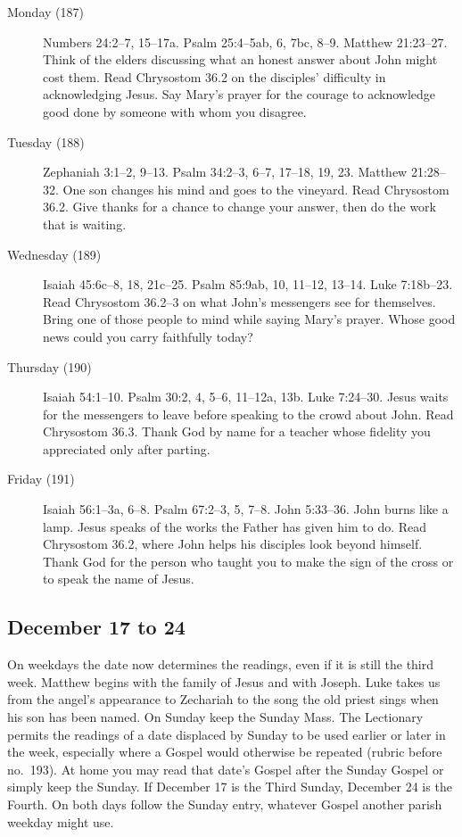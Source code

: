 \begin{description}
\item[Monday (187)] Numbers 24:2--7, 15--17a. Psalm 25:4--5ab, 6, 7bc,
8--9. Matthew 21:23--27. Think of the elders discussing what an honest
answer about John might cost them. Read Chrysostom 36.2 on the disciples'
difficulty in acknowledging Jesus. Say Mary's prayer for the courage to
acknowledge good done by someone with whom you disagree.
\item[Tuesday (188)] Zephaniah 3:1--2, 9--13. Psalm 34:2--3, 6--7,
17--18, 19, 23. Matthew 21:28--32. One son changes his mind and goes
to the vineyard. Read Chrysostom 36.2. Give thanks for a chance to change
your answer, then do the work that is waiting.
\item[Wednesday (189)] Isaiah 45:6c--8, 18, 21c--25. Psalm 85:9ab, 10,
11--12, 13--14. Luke 7:18b--23. Read Chrysostom 36.2--3 on what John's
messengers see for themselves. Bring one of those people to mind while
saying Mary's prayer. Whose good news could you carry faithfully today?
\item[Thursday (190)] Isaiah 54:1--10. Psalm 30:2, 4, 5--6, 11--12a,
13b. Luke 7:24--30. Jesus waits for the messengers to leave before
speaking to the crowd about John. Read Chrysostom 36.3. Thank God by
name for a teacher whose fidelity you appreciated only after parting.
\item[Friday (191)] Isaiah 56:1--3a, 6--8. Psalm 67:2--3, 5, 7--8.
John 5:33--36. John burns like a lamp. Jesus speaks of the works the
Father has given him to do. Read Chrysostom 36.2, where John helps his
disciples look beyond himself. Thank God for the person who taught you
to make the sign of the cross or to speak the name of Jesus.
\end{description}

\subsection{December 17 to 24}
\label{sec:pc-advent-last-days}

On weekdays the date now determines the readings, even if it is still
the third week. Matthew begins with the family of Jesus and with Joseph.
Luke takes us from the angel's appearance to Zechariah to the song the
old priest sings when his son has been named. On Sunday keep the Sunday Mass. The Lectionary permits
the readings of a date displaced by Sunday to be used earlier or later
in the week, especially where a Gospel would otherwise be repeated
(rubric before no.~193). At home you may read that date's Gospel after
the Sunday Gospel or simply keep the Sunday. If December 17 is the
Third Sunday, December 24 is the Fourth. On both days follow the Sunday
entry, whatever Gospel another parish weekday might use.

